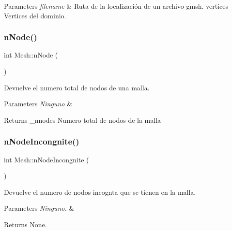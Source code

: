 \begin{DoxyParams}{Parameters}
{\em filename} & Ruta de la localización de un archivo gmsh.  vertices Vertices del dominio. \\
\hline
\end{DoxyParams}
\hypertarget{class_mesh_abc68a06825b9554803c18248501338c7}{}\label{class_mesh_abc68a06825b9554803c18248501338c7} 
\subsubsection{\texorpdfstring{n\+Node()}{nNode()}}
{\footnotesize\ttfamily int Mesh\+::n\+Node (\begin{DoxyParamCaption}{ }\end{DoxyParamCaption})\hspace{0.3cm}{\ttfamily [inline]}}



Devuelve el numero total de nodos de una malla. 


\begin{DoxyParams}{Parameters}
{\em Ninguno} & \\
\hline
\end{DoxyParams}
\begin{DoxyReturn}{Returns}
\+\_\+nnodes Numero total de nodos de la malla 
\end{DoxyReturn}
\hypertarget{class_mesh_a53a4d94cd56d2cb6439519645269d380}{}\label{class_mesh_a53a4d94cd56d2cb6439519645269d380} 
\subsubsection{\texorpdfstring{n\+Node\+Incongnite()}{nNodeIncongnite()}}
{\footnotesize\ttfamily int Mesh\+::n\+Node\+Incongnite (\begin{DoxyParamCaption}{ }\end{DoxyParamCaption})\hspace{0.3cm}{\ttfamily [inline]}}



Devuelve el numero de nodos incognta que se tienen en la malla. 


\begin{DoxyParams}{Parameters}
{\em Ninguno.} & \\
\hline
\end{DoxyParams}
\begin{DoxyReturn}{Returns}
None. 
\end{DoxyReturn}
\hypertarget{class_mesh_a0acd89c6420f7edc3c8ee8169662b67b}{}\label{class_mesh_a0acd89c6420f7edc3c8ee8169662b67b} 

